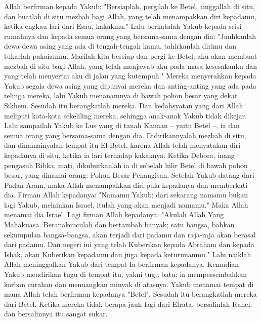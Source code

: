 \begin{biblechapter} %
 Allah berfirman kepada Yakub: "Bersiaplah, pergilah ke Betel, tinggallah di situ, dan buatlah di situ mezbah bagi Allah, yang telah menampakkan diri kepadamu, ketika engkau lari dari Esau, kakakmu."
\verse Lalu berkatalah Yakub kepada seisi rumahnya dan kepada semua orang yang bersama-sama dengan dia: "Jauhkanlah dewa-dewa asing yang ada di tengah-tengah kamu, tahirkanlah dirimu dan tukarlah pakaianmu.
\verse Marilah kita bersiap dan pergi ke Betel; aku akan membuat mezbah di situ bagi Allah, yang telah menjawab aku pada masa kesesakanku dan yang telah menyertai aku di jalan yang kutempuh."
\verse Mereka menyerahkan kepada Yakub segala dewa asing yang dipunyai mereka dan anting-anting yang ada pada telinga mereka, lalu Yakub menanamnya di bawah pohon besar yang dekat Sikhem.
\verse Sesudah itu berangkatlah mereka. Dan kedahsyatan yang dari Allah meliputi kota-kota sekeliling mereka, sehingga anak-anak Yakub tidak dikejar.
\verse Lalu sampailah Yakub ke Lus yang di tanah Kanaan -- yaitu Betel --, ia dan semua orang yang bersama-sama dengan dia.
\verse Didirikannyalah mezbah di situ, dan dinamainyalah tempat itu El-Betel, karena Allah telah menyatakan diri kepadanya di situ, ketika ia lari terhadap kakaknya.
\verse Ketika Debora, inang pengasuh Ribka, mati, dikuburkanlah ia di sebelah hilir Betel di bawah pohon besar, yang dinamai orang: Pohon Besar Penangisan.
\verse Setelah Yakub datang dari Padan-Aram, maka Allah menampakkan diri pula kepadanya dan memberkati dia.
\verse Firman Allah kepadanya: "Namamu Yakub; dari sekarang namamu bukan lagi Yakub, melainkan Israel, itulah yang akan menjadi namamu." Maka Allah menamai dia Israel.
\verse Lagi firman Allah kepadanya: "Akulah Allah Yang Mahakuasa. Beranakcuculah dan bertambah banyak; satu bangsa, bahkan sekumpulan bangsa-bangsa, akan terjadi dari padamu dan raja-raja akan berasal dari padamu.
\verse Dan negeri ini yang telah Kuberikan kepada Abraham dan kepada Ishak, akan Kuberikan kepadamu dan juga kepada keturunanmu."
\verse Lalu naiklah Allah meninggalkan Yakub dari tempat Ia berfirman kepadanya.
\verse Kemudian Yakub mendirikan tugu di tempat itu, yakni tugu batu; ia mempersembahkan korban curahan dan menuangkan minyak di atasnya.
\verse Yakub menamai tempat di mana Allah telah berfirman kepadanya "Betel".
 Sesudah itu berangkatlah mereka dari Betel. Ketika mereka tidak berapa jauh lagi dari Efrata, bersalinlah Rahel, dan bersalinnya itu sangat sukar.

\end{biblechapter}
